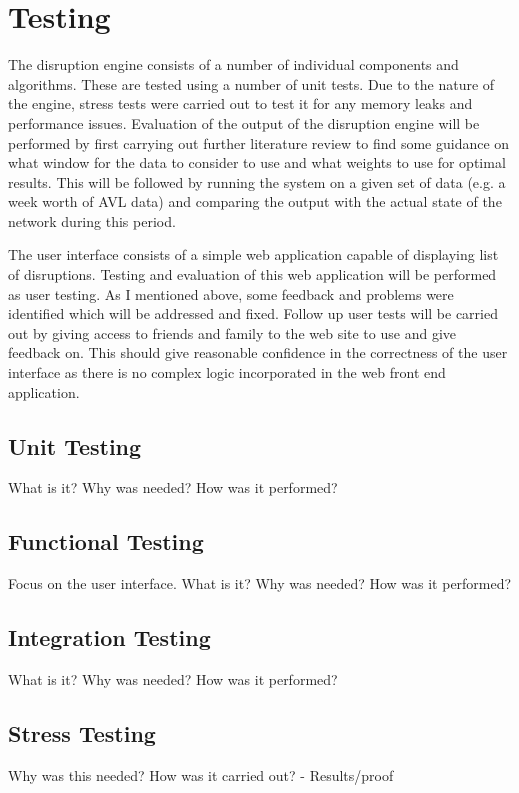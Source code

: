 \chapter{Testing}
The disruption engine consists of a number of individual components and algorithms.
These are tested using a number of unit tests. Due to the nature of
the engine, stress tests were carried out to test it for any memory leaks and
performance issues. Evaluation of the output of the disruption engine will be
performed by first carrying out further literature review to find some guidance
on what window for the data to consider to use and what weights to use for
optimal results. This will be followed by running the system on a given set
of data (e.g. a week worth of AVL data) and comparing the output with the
actual state of the network during this period.

The user interface consists of a simple web application capable of displaying
list of disruptions. Testing and evaluation of this web application will be
performed as user testing. As I mentioned above, some feedback and problems
were identified which will be addressed and fixed. Follow up user tests will be
carried out by giving access to friends and family to the web site to use and
give feedback on. This should give reasonable confidence in the correctness of
the user interface as there is no complex logic incorporated in the web front
end application.
\section{Unit Testing} 
What is it?
Why was needed?
How was it performed?

\section{Functional Testing}
Focus on the user interface.
What is it?
Why was needed?
How was it performed?

\section{Integration Testing}
What is it?
Why was needed?
How was it performed?

\section{Stress Testing}
Why was this needed?
How was it carried out? - Results/proof